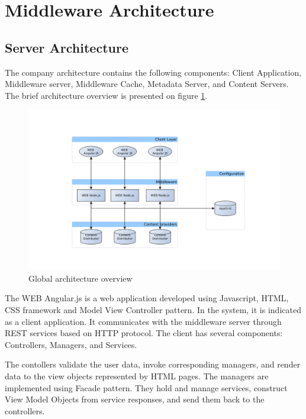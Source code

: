 \section{Middleware Architecture}

\subsection{Server Architecture}

The company architecture contains the following components: Client Application, Middleware server, Middleware Cache, Metadata Server, and Content Servers. The brief architecture overview is presented on figure \ref{fig:arch_overview}. 


\begin{figure}[h]
    \centering
	\includegraphics[width=\textwidth]{images/thesis_global_architecture_existing.png}
    \caption{Global architecture overview}
    \label{fig:arch_overview}
\end{figure}


The WEB Angular.js is a web application developed using Javascript, HTML, CSS framework and Model View Controller pattern. In the system, it is indicated as a client application. It communicates with the middleware server through REST services based on HTTP protocol. The client has several components: Controllers, Managers, and Services. 

The contollers validate the user data, invoke corresponding managers, and render data to the view objects represented by HTML pages. The managers are implemented using Facade pattern\cite{DesignPatterns}. They hold and manage services, construct View Model Objects from service responses, and send them back to the controllers. 

